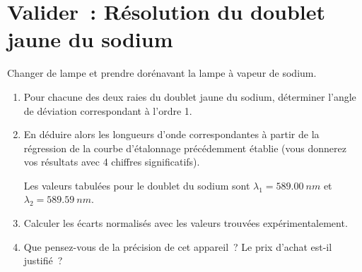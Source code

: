 \documentclass[../main/main.tex]{subfiles}
\begin{document}
\section{Valider~: Résolution du doublet jaune du sodium}
Changer de lampe et prendre dorénavant la lampe à vapeur de sodium.

\begin{enumerate}[label=\sqenumi, resume]
  \item Pour chacune des deux raies du doublet jaune du sodium, déterminer
    l'angle de déviation correspondant à l'ordre 1.

  \item En déduire alors les longueurs d'onde correspondantes à partir de la
    régression de la courbe d'étalonnage précédemment établie (vous donnerez vos
    résultats avec 4 chiffres significatifs). 

  Les valeurs tabulées pour le doublet du sodium sont $\lambda_1 =
  \SI{589,00}{nm}$ et $\lambda_2 = \SI{589,59}{nm}$.

  \item Calculer les écarts normalisés avec les valeurs trouvées
    expérimentalement. 

  \item Que pensez-vous de la précision de cet appareil~? Le prix d'achat est-il
    justifié~?
\end{enumerate}
\end{document}
